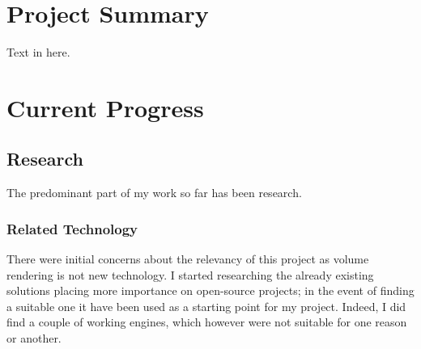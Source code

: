 \documentclass[11pt,fleqn,twoside]{article}
\begin{document}

\mmp

\setcounter{tocdepth}{3} %
\tableofcontents

\newpage

\section{Project Summary}
Text in here.

\section{Current Progress}


\subsection{Research}
The predominant part of my work so far has been research.

\subsubsection{Related Technology}
There were initial concerns about the relevancy of this project as volume rendering is not new technology. I started researching the already existing solutions placing more importance on open-source projects; in the event of finding a suitable one it have been used as a starting point for my project. Indeed, I did find a couple of working engines, which however were not suitable for one reason or another.
\end{document}
